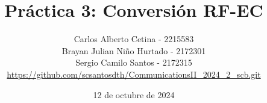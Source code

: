 \documentclass{journal}[IEEEtran, twocolumn]             %
\newcommand{\dochead}{Práctica 3}
\newcommand{\docsubhead}{Conversión RF-EC}
\newcommand{\titulo}{\dochead: \docsubhead}
\newcommand{\fecha}{12 de octubre de 2024}
\begin{document}

\title{\textbf{\titulo}}            %

\author{
Carlos Alberto Cetina - 2215583\\
Brayan Julian Niño Hurtado - 2172301\\
Sergio Camilo Santos - 2172315\\
\href{https://github.com/scsantosdth/CommunicationsII_2024_2_scb.git}{https://github.com/scsantosdth/CommunicationsII_2024_2_scb.git}
}


\date{\fecha}                       %

\maketitle                          %
\thispagestyle{fancy}          %

%


\color{black}
\end{document}

